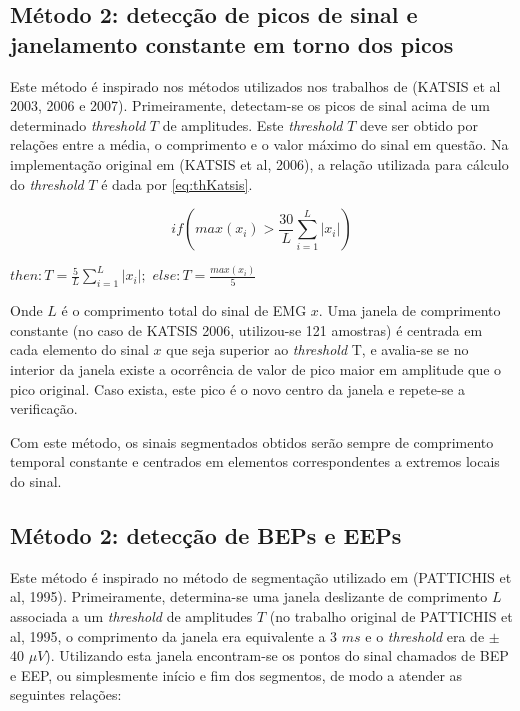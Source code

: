 \documentclass[
	12pt,				%
	openright,			%
	oneside,
	a4paper,			%
	english,			%
	francais,			%
	spanish,			%
	brazil				%
	]{abntex2}
\begin{document}
\subsection{Método 2: detecção de picos de sinal e janelamento constante em torno dos picos}

	Este método é inspirado nos métodos utilizados nos trabalhos de (KATSIS et al 2003, 2006 e 2007). Primeiramente, detectam-se os picos de sinal acima de um determinado \emph{threshold} $T$ de amplitudes. Este \emph{threshold} $T$ deve ser obtido por relações entre a média, o comprimento e o valor máximo do sinal em questão. Na implementação original em (KATSIS et al, 2006), a relação utilizada para cálculo do \emph{threshold} $T$ é dada por \ref{eq:thKatsis}.

\begin{equation}
\label{eq:thKatsis}
  if\left(max(x_i) > \frac{30}{L}\sum_{i=1}^{L}|x_i|\right)
\end{equation}
\begin{center}
$then: T = \frac{5}{L}\sum_{i=1}^{L}|x_i|;$
$else: T = \frac{max(x_i)}{5}$
\end{center}

	Onde $L$ é o comprimento total do sinal de EMG $x$. Uma janela de comprimento constante (no caso de KATSIS 2006, utilizou-se 121 amostras) é centrada em cada elemento do sinal $x$ que seja superior ao \emph{threshold} T, e avalia-se se no interior da janela existe a ocorrência de valor de pico maior em amplitude que o pico original. Caso exista, este pico é o novo centro da janela e repete-se a verificação.

	Com este método, os sinais segmentados obtidos serão sempre de comprimento temporal constante e centrados em elementos correspondentes a extremos locais do sinal.

\subsection{Método 2: detecção de BEPs e EEPs}

	Este método é inspirado no método de segmentação utilizado em (PATTICHIS et al, 1995). Primeiramente, determina-se uma janela deslizante de comprimento $L$ associada a um \emph{threshold} de amplitudes $T$ (no trabalho original de PATTICHIS et al, 1995, o comprimento da janela era equivalente a 3 $ms$ e o \emph{threshold} era de $\pm$ 40 $\mu V$). Utilizando esta janela encontram-se os pontos do sinal chamados de BEP e EEP, ou simplesmente início e fim dos segmentos, de modo a atender as seguintes relações:
\end{document}
